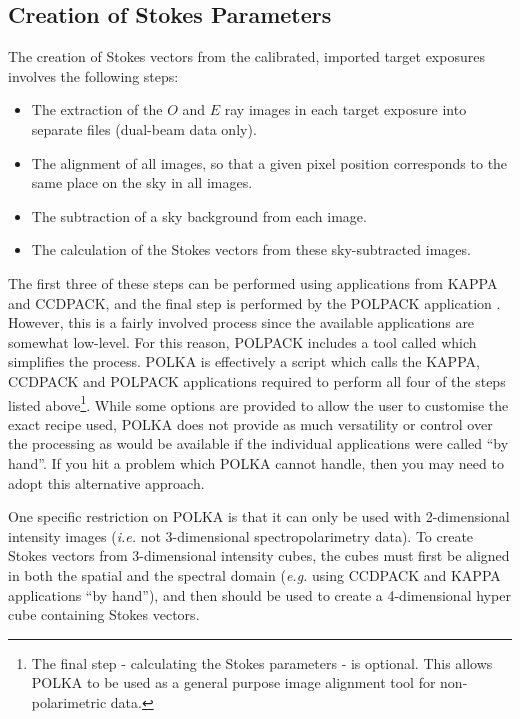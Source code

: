\documentclass[twoside,11pt]{starlink}
\begin{document}
\subsection{Creation of Stokes Parameters}
The creation of Stokes vectors from the calibrated, imported
target exposures involves the following steps:

\begin{itemize}
\item The extraction of the $O$ and $E$ ray images in each target
exposure into separate files (dual-beam data only).
\item The alignment of all images, so
that a given pixel position corresponds to the same place on the sky in
all images.
\item The subtraction of a sky background from each image.
\item The calculation of the Stokes vectors from these sky-subtracted
images.
\end{itemize}

The first three of these steps can be performed using applications from
KAPPA and CCDPACK, and the final step is performed by the POLPACK
application . However, this is a fairly involved
process since the available applications are somewhat low-level. For this
reason, POLPACK includes a tool called  which
simplifies the process. POLKA is effectively a script which calls the
KAPPA, CCDPACK and POLPACK applications required to perform all four of
the steps listed above\footnote{The final step - calculating the Stokes
parameters - is optional. This allows POLKA to be used as a general
purpose image alignment tool for non-polarimetric data.}. While some
options are provided to allow the user to customise the exact recipe
used, POLKA does not provide as much versatility or control over the
processing as would be available if the individual applications were
called ``by hand''. If you hit a problem which POLKA cannot handle, then
you may need to adopt this alternative approach.

One specific restriction on POLKA is that it can only be used with
2-dimensional intensity images (\emph{i.e.} not 3-dimensional
spectropolarimetry data). To create Stokes vectors from 3-dimensional
intensity cubes, the cubes must first be aligned in both the spatial and
the spectral domain (\emph{e.g.} using CCDPACK and KAPPA applications
``by hand''), and then  should be used to create
a 4-dimensional hyper cube containing Stokes vectors.
\end{document}
